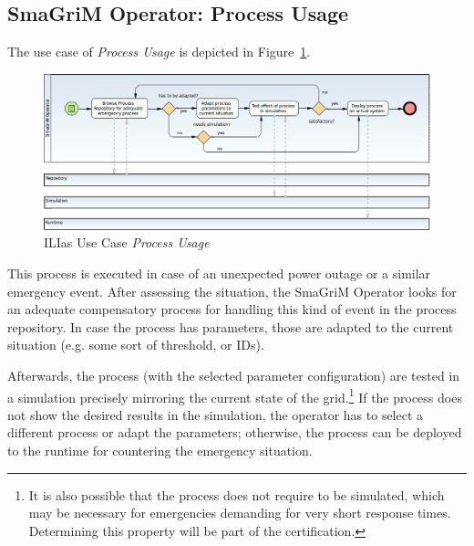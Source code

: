 
\subsection{SmaGriM Operator: Process Usage}

The use case of \emph{Process Usage} is depicted in Figure~\ref{fig:ilias-proc-usage}.

\begin{figure}[ht]
	\centering
	\includegraphics[width=1\textwidth]{ilias/bpmn_ilias-3.png}
	\caption{ILIas Use Case \emph{Process Usage}}
	\label{fig:ilias-proc-usage}
\end{figure}

This process is executed in case of an unexpected power outage or a similar
emergency event.  After assessing the situation, the SmaGriM Operator looks for
an adequate compensatory process for handling this kind of event in the process
repository.  In case the process has parameters, those are adapted to the current
situation (e.g. some sort of threshold, or IDs).

Afterwards, the process (with the selected parameter configuration) are tested in
a simulation precisely mirroring the current state of the grid.\footnote{It is
also possible that the process does not require to be simulated, which may be
necessary for emergencies demanding for very short response times.  Determining
this property will be part of the certification.} If the process does not show
the desired results in the simulation, the operator has to select a different
process or adapt the parameters; otherwise, the process can be deployed to the
runtime for countering the emergency situation.



